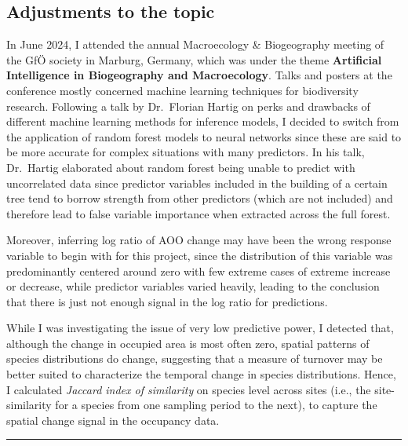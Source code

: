 \documentclass[
  letterpaper,
  DIV=11,
  numbers=noendperiod]{scrartcl}
\begin{document}
\subsection{Adjustments to the topic}\label{adjustments-to-the-topic}

In June 2024, I attended the annual Macroecology \& Biogeography meeting
of the GfÖ society in Marburg, Germany, which was under the theme
\textbf{Artificial Intelligence in Biogeography and Macroecology}. Talks
and posters at the conference mostly concerned machine learning
techniques for biodiversity research. Following a talk by Dr.~Florian
Hartig on perks and drawbacks of different machine learning methods for
inference models, I decided to switch from the application of random
forest models to neural networks since these are said to be more
accurate for complex situations with many predictors. In his talk,
Dr.~Hartig elaborated about random forest being unable to predict with
uncorrelated data since predictor variables included in the building of
a certain tree tend to borrow strength from other predictors (which are
not included) and therefore lead to false variable importance when
extracted across the full forest.

Moreover, inferring log ratio of AOO change may have been the wrong
response variable to begin with for this project, since the distribution
of this variable was predominantly centered around zero with few extreme
cases of extreme increase or decrease, while predictor variables varied
heavily, leading to the conclusion that there is just not enough signal
in the log ratio for predictions.

While I was investigating the issue of very low predictive power, I
detected that, although the change in occupied area is most often zero,
spatial patterns of species distributions do change, suggesting that a
measure of turnover may be better suited to characterize the temporal
change in species distributions. Hence, I calculated \emph{Jaccard index
of similarity} on species level across sites (i.e., the site-similarity
for a species from one sampling period to the next), to capture the
spatial change signal in the occupancy data.

\begin{center}\rule{0.5\linewidth}{0.5pt}\end{center}
\end{document}
